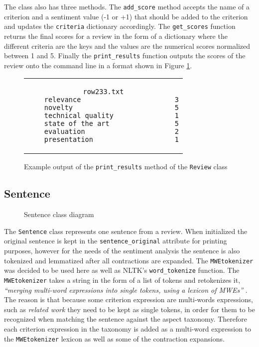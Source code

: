 The class also has three methods. The \texttt{add\_score} method accepts the name of a criterion and a sentiment value (-1 or +1) that should be added to the criterion and updates the \texttt{criteria} dictionary accordingly. The \texttt{get\_scores} function returns the final scores for a review in the form of a dictionary where the different criteria are the keys and the values are the numerical scores normalized between 1 and 5. Finally the \texttt{print\_results} function outputs the scores of the review onto the command line in a format shown in Figure \ref{img:r_results}.
\begin{figure}[!htb]
\centering
\begin{tabular}{c}
\begin{lstlisting}
row233.txt
	relevance                       3
	novelty                         5
	technical quality               1
	state of the art                5
	evaluation                      2
	presentation                    1
\end{lstlisting}
\end{tabular}
\caption{Example output of the \texttt{print\_results} method of the \texttt{Review} class}
\label{img:r_results}
\end{figure}

\subsection{Sentence}
\begin{figure}[H]
\centering
{}
\caption{Sentence class diagram}
\label{img:sentence}
\end{figure}

The \texttt{Sentence} class represents one sentence from a review. When initialized the original sentence is kept in the \texttt{sentence\_original} attribute for printing purposes, however for the needs of the sentiment analysis the sentence is also tokenized and lemmatized after all contractions are expanded. The \texttt{MWEtokenizer} was decided to be used here as well as NLTK's \texttt{word\_tokenize} function. The \texttt{MWEtokenizer} takes a string in the form of a list of tokens and
retokenizes it, \textit{``merging multi-word expressions into single tokens, using a lexicon of MWEs''} \cite{nltk_mwe_docs}. The reason is that because some criterion expression are multi-words expressions, such as \textit{related work} they need to be kept as single tokens, in order for them to be recognized when matching the sentence against the aspect taxonomy. Therefore each criterion expression in the taxonomy is added as a multi-word expression to the \texttt{MWEtokenizer} lexicon as well as some of the contraction expansions.

